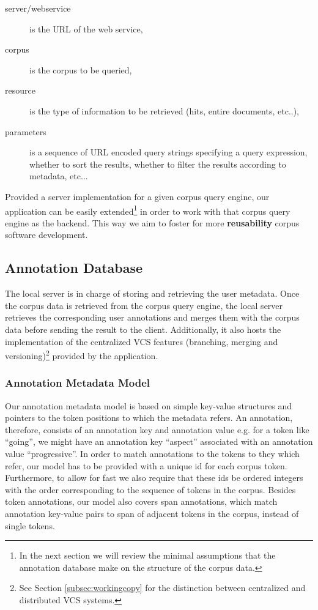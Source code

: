 \documentclass{sig-alternate}
\begin{document}
\begin{description}
\item [server/webservice] is the URL of the web service,
\item [corpus] is the corpus to be queried,
\item [resource] is the type of information to be retrieved (hits, entire documents, etc..),
\item [parameters] is a sequence of URL encoded query strings specifying a query expression,
  whether to sort the results, whether to filter the results according to metadata, etc...
\end{description}

Provided a server implementation for a given corpus query engine, our application can be easily
extended\footnote{
  In the next section we will review the minimal assumptions that the annotation database make on
the structure of the corpus data.
} in order to work with that corpus query engine as the backend. This way we aim to
foster for more \textbf{reusability} corpus software development.

\subsection{Annotation Database}\label{subsec:db}
The local server is in charge of storing and retrieving the user metadata. Once the corpus data
is retrieved from the corpus query engine, the local server retrieves the corresponding user
annotations and merges them with the corpus data before sending the result to the client.
Additionally, it also hosts the implementation of the centralized VCS features (branching,
merging and versioning)\footnote{
  See Section \ref{subsec:workingcopy} for the distinction between centralized and distributed
  VCS systems.
} provided by the application.

\subsubsection{Annotation Metadata Model}\label{subsec:datamodel}
Our annotation metadata model is based on simple key-value structures and pointers to the token
positions to which the metadata refers. An annotation, therefore, consists of an annotation key
and annotation value \textemdash e.g. for a token like ``going'', we might have an annotation
key ``aspect'' associated with an annotation value ``progressive''. In order to match annotations
to the tokens to they which refer, our model has to be provided with a unique id for each
corpus token. Furthermore, to allow for fast we also require that these ids be ordered integers
\textemdash with the order corresponding to the sequence of tokens in the corpus.
Besides token annotations, our model also covers span annotations, which match annotation
key-value pairs to span of adjacent tokens in the corpus, instead of single tokens.
\end{document}
